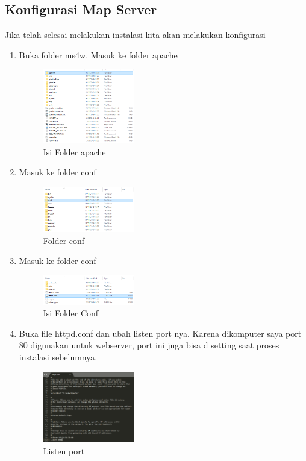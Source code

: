 \subsection{Konfigurasi Map Server}
Jika telah selesai melakukan instalasi kita akan melakukan konfigurasi
\begin{enumerate}
  \item Buka folder ms4w. Masuk ke folder apache
  \hfill\break
    \begin{figure}[H]
		\includegraphics[width=4cm]{figures/1174002/4/3.png}
		\centering
		\caption{Isi Folder apache}
    \end{figure}


  \item Masuk ke folder conf
  \hfill\break
    \begin{figure}[H]
		\includegraphics[width=4cm]{figures/1174002/4/4.png}
		\centering
		\caption{Folder conf}
    \end{figure}
  \item Masuk ke folder conf
  \hfill\break
    \begin{figure}[H]
		\includegraphics[width=4cm]{figures/1174002/4/5.png}
		\centering
		\caption{Isi Folder Conf}
    \end{figure}

  \item Buka file httpd.conf dan ubah listen port nya. Karena dikomputer saya port 80 digunakan untuk webserver, port ini juga bisa d setting saat proses instalasi sebelumnya.
  \hfill\break
    \begin{figure}[H]
		\includegraphics[width=4cm]{figures/1174002/4/6.png}
		\centering
		\caption{Listen port}
    \end{figure}


\end{enumerate}
